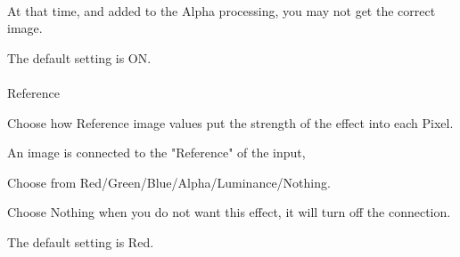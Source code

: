 \documentclass[a4paper,12pt]{article}
\begin{document}
\newpage

\thispagestyle{empty}

\ \vspace{-0.2em}
\par
At that time, and added to the Alpha processing, you may not get the correct image.\par
The default setting is ON.\\
\\
Reference\par
Choose how Reference image values put the strength of the effect into each Pixel.\par
An image is connected to the "Reference" of the input,\par
Choose from Red/Green/Blue/Alpha/Luminance/Nothing.\par
Choose Nothing when you do not want this effect, it will turn off the connection.\par
The default setting is Red.
\end{document}
